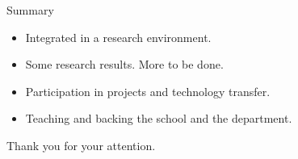 \documentclass{beamer}
\begin{document}
{
\begin{frame}[plain]
\end{frame}
}

{
\begin{frame}[plain]
\end{frame}
}

\begin{frame}{Summary}

  \begin{block}{}
        \begin{center}
          \begin{itemize}
            \item Integrated in a research environment.
            \item Some research results. More to be done.
            \item Participation in projects and technology transfer.
            \item Teaching and backing the school and the department.
          \end{itemize}
        \end{center}
  \end{block}
  
  \vskip 1cm
        \begin{center}
          Thank you for your attention. 

        \end{center}
\end{frame}
\end{document}
